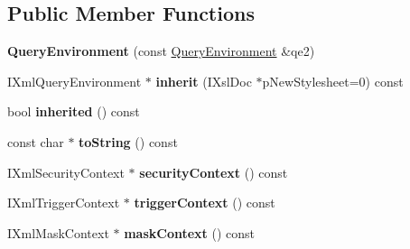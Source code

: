 \subsection*{\-Public \-Member \-Functions}
\begin{DoxyCompactItemize}
\item 
\hypertarget{classgeneral__server_1_1QueryEnvironment_a06c7ddb26cc57b5eb4d6d6094376d87e}{{\bfseries \-Query\-Environment} (const \hyperlink{classgeneral__server_1_1QueryEnvironment}{\-Query\-Environment} \&qe2)}\label{classgeneral__server_1_1QueryEnvironment_a06c7ddb26cc57b5eb4d6d6094376d87e}

\item 
\hypertarget{classgeneral__server_1_1QueryEnvironment_a80d57dfcc5772f909f5ae45e935343e5}{\-I\-Xml\-Query\-Environment $\ast$ {\bfseries inherit} (\-I\-Xsl\-Doc $\ast$p\-New\-Stylesheet=0) const }\label{classgeneral__server_1_1QueryEnvironment_a80d57dfcc5772f909f5ae45e935343e5}

\item 
\hypertarget{classgeneral__server_1_1QueryEnvironment_a126d53001aa051243352cf7e9c03a325}{bool {\bfseries inherited} () const }\label{classgeneral__server_1_1QueryEnvironment_a126d53001aa051243352cf7e9c03a325}

\item 
\hypertarget{classgeneral__server_1_1QueryEnvironment_a5d28faf2592018e31bd80f4de163f38d}{const char $\ast$ {\bfseries to\-String} () const }\label{classgeneral__server_1_1QueryEnvironment_a5d28faf2592018e31bd80f4de163f38d}

\item 
\hypertarget{classgeneral__server_1_1QueryEnvironment_afa335804ebdb4a04acbd3c92c1bd603f}{\-I\-Xml\-Security\-Context $\ast$ {\bfseries security\-Context} () const }\label{classgeneral__server_1_1QueryEnvironment_afa335804ebdb4a04acbd3c92c1bd603f}

\item 
\hypertarget{classgeneral__server_1_1QueryEnvironment_aecc4de2657f1c31d88ab7f69f4363607}{\-I\-Xml\-Trigger\-Context $\ast$ {\bfseries trigger\-Context} () const }\label{classgeneral__server_1_1QueryEnvironment_aecc4de2657f1c31d88ab7f69f4363607}

\item 
\hypertarget{classgeneral__server_1_1QueryEnvironment_a7fec3c6f0469ccb85450c9927b5ec51c}{\-I\-Xml\-Mask\-Context $\ast$ {\bfseries mask\-Context} () const }\label{classgeneral__server_1_1QueryEnvironment_a7fec3c6f0469ccb85450c9927b5ec51c}


\end{DoxyCompactItemize}
